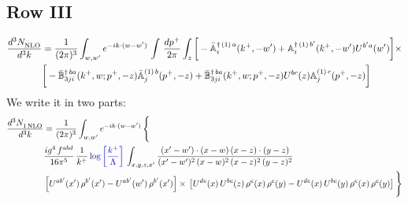 \documentclass[9pt]{article}
\def\mf#1{\mathbb{#1}}
\numberwithin{equation}{section}
\begin{document}
\subsection{Row III}
\begin{align}
\frac{d^{3}N_{\rm NLO}^{\rm}}{d^{3}k}  & = \frac{1}{(2\pi)^{3}}  \int_{w, w^\prime} e^{-ik\cdot (w-w')}\, \int\,\frac{dp^{+}}{2\pi} \int_{z} \bigg[-\bar{\mf{A}}^{\dagger\,(1)\,a}_{i}(k^{+},-w^{\prime})+\mf{A}^{\dagger\, (1)\, b^{\prime}}_{i}(k^{+},-w^{\prime})U^{b^{\prime}a}(w^{\prime})\bigg]\times \notag \\ &  \bigg[-\Bar{\mf{B}}^{\dagger\, ba}_{3ji}(k^{+}, w; p^{+}, -z)\Bar{\mf{A}}^{(1)\,b}_{j}(p^{+}, - z)+ \Bar{\mf{B}}^{\dagger\, ba}_{3ji}(k^{+},w; p^{+},-z) U^{bc}(z) \mf{A}^{(1)\, c}_{j}(p^{+},- z)\bigg]\nonumber
\end{align}
We write it in two parts: 
\begin{align}
   \frac{d^{3}N_{1\,\rm NLO}^{\rm}}{d^{3}k}  & = \frac{1}{(2\pi)^{3}}  \int_{w, w^\prime} e^{-ik\cdot (w-w')}\, \Bigg\{\notag \\ & \frac{ig^{4}\,f^{abd}}{16\pi^{5}}\,\frac{1}{k^{+}}\,{\color{blue}\log{\left[\frac{k^{+}}{\Lambda}\right]}}\,\int_{x,y,z,x'} \frac{(x'-w')\cdot (x-w)\, (x-z)\cdot (y-z)}{(x'-w')^{2}\, (x-w)^{2}\, (x-z)^{2}\, (y-z)^{2}}\, \notag \\ & \left[U^{ab'}(x')\,\rho^{b'}(x')-U^{ab'}(w')\, \rho^{b'}(x')\right]\times\, \left[U^{de}(x)\,U^{bc}(z)\, \rho^{e}(x)\,\rho^{c}(y)-U^{de}(x)\,U^{bc}(y)\,\rho^{e}(x)\,\rho^{c}(y)\right]\Bigg\}
\end{align}
\end{document}

